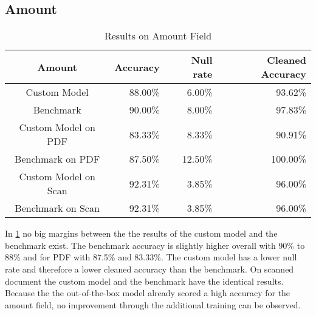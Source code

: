 \subsection*{Amount}
\begin{table}[ht]   %
    \centering
    \footnotesize
    \begin{tabular}{c|rrr} %
        \toprule    %
        Amount  & Accuracy  & Null rate & Cleaned Accuracy \\
        \midrule    %
        Custom Model               & 88.00\%   & 6.00\%   & 93.62\% \\
        Benchmark           & 90.00\%   & 8.00\%  & 97.83\%\\
        \midrule    %
        Custom Model on PDF        & 83.33\%   & 8.33\%  & 90.91\% \\
        Benchmark on PDF    & 87.50\%   & 12.50\%  & 100.00\% \\
        \midrule    %
        Custom Model on Scan       & 92.31\%  & 3.85\%   & 96.00\% \\
        Benchmark on Scan   & 92.31\%  & 3.85\%  & 96.00\% \\

        \bottomrule %
    \end{tabular}
    \caption{Results on Amount Field}
    \label{table:Model_Bench_Amount}
\end{table}

In \cref{table:Model_Bench_Amount} no big margins between the the results of the custom model and the benchmark exist.
The benchmark accuracy is slightly higher overall with 90\% to 88\% and for PDF with 87.5\% and 83.33\%. 
The custom model has a lower null rate and therefore a lower cleaned accuracy than the benchmark.
On scanned document the custom model and the benchmark have the identical results.
Because the the out-of-the-box model already scored a high accuracy for the amount field, no improvement through the additional training can be observed.

